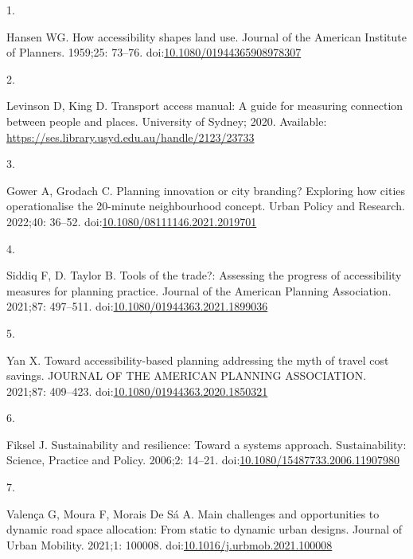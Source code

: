 \documentclass[10pt,letterpaper]{article}
\newlength{\cslhangindent}
\newlength{\csllabelwidth}
\newlength{\cslentryspacingunit} %
\newenvironment{CSLReferences}[2] %
 {%
  \setlength{\parindent}{0pt}
  \ifodd #1
  \let\oldpar\par
  \def\par{\hangindent=\cslhangindent\oldpar}
  \fi
  \setlength{\parskip}{#2\cslentryspacingunit}
 }%
 {}
\newcommand{\CSLLeftMargin}[1]{\parbox[t]{\csllabelwidth}{#1}}
\newcommand{\CSLRightInline}[1]{\parbox[t]{\linewidth - \csllabelwidth}{#1}\break}
\begin{document}
\hypertarget{refs}{}
\begin{CSLReferences}{0}{0}
\leavevmode{}%
\CSLLeftMargin{1. }%
\CSLRightInline{Hansen WG. How accessibility shapes land use. Journal of
the American Institute of Planners. 1959;25: 73--76.
doi:\href{https://doi.org/10.1080/01944365908978307}{10.1080/01944365908978307}}

\leavevmode{}%
\CSLLeftMargin{2. }%
\CSLRightInline{Levinson D, King D. Transport access manual: {A} guide
for measuring connection between people and places. {University of
Sydney}; 2020. Available:
\url{https://ses.library.usyd.edu.au/handle/2123/23733}}

\leavevmode{}%
\CSLLeftMargin{3. }%
\CSLRightInline{Gower A, Grodach C. Planning innovation or city
branding? Exploring how cities operationalise the 20-minute
neighbourhood concept. Urban Policy and Research. 2022;40: 36--52.
doi:\href{https://doi.org/10.1080/08111146.2021.2019701}{10.1080/08111146.2021.2019701}}

\leavevmode{}%
\CSLLeftMargin{4. }%
\CSLRightInline{Siddiq F, D. Taylor B. Tools of the trade?: Assessing
the progress of accessibility measures for planning practice. Journal of
the American Planning Association. 2021;87: 497--511.
doi:\href{https://doi.org/10.1080/01944363.2021.1899036}{10.1080/01944363.2021.1899036}}

\leavevmode{}%
\CSLLeftMargin{5. }%
\CSLRightInline{Yan X. Toward accessibility-based planning addressing
the myth of travel cost savings. {JOURNAL} {OF} {THE} {AMERICAN}
{PLANNING} {ASSOCIATION}. 2021;87: 409--423.
doi:\href{https://doi.org/10.1080/01944363.2020.1850321}{10.1080/01944363.2020.1850321}}

\leavevmode{}%
\CSLLeftMargin{6. }%
\CSLRightInline{Fiksel J. Sustainability and resilience: Toward a
systems approach. Sustainability: Science, Practice and Policy. 2006;2:
14--21.
doi:\href{https://doi.org/10.1080/15487733.2006.11907980}{10.1080/15487733.2006.11907980}}

\leavevmode{}%
\CSLLeftMargin{7. }%
\CSLRightInline{Valença G, Moura F, Morais De Sá A. Main challenges and
opportunities to dynamic road space allocation: From static to dynamic
urban designs. Journal of Urban Mobility. 2021;1: 100008.
doi:\href{https://doi.org/10.1016/j.urbmob.2021.100008}{10.1016/j.urbmob.2021.100008}}


\end{CSLReferences}
\end{document}
